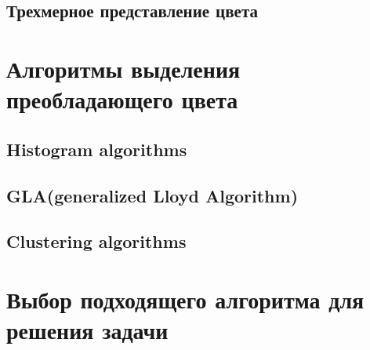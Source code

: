 \subsection{ Трехмерное представление цвета}

\section{ Алгоритмы выделения преобладающего цвета}
\subsection{ Histogram algorithms}
\subsection{ GLA(generalized Lloyd Algorithm)}
\subsection{ Clustering algorithms}

\section{ Выбор подходящего алгоритма для решения задачи}
